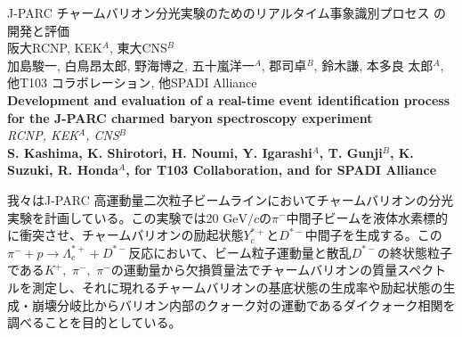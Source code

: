 \documentclass[12pt,a4paper,upLaTeX]{jsarticle}
\begin{document}
\vspace{-5pt}
\begin{center}
{\gt \Large J-PARC チャームバリオン分光実験のためのリアルタイム事象識別プロセス の開発と評価 }\\[14pt]

{\gt \large 阪大RCNP, KEK$^A$, 東大CNS$^B$ \\ 加島駿一, 白鳥昂太郎, 野海博之, 五十嵐洋一$^A$, 郡司卓$^B$, 鈴木謙, 本多良
太郎$^A$, 他T103 コラボレーション, 他SPADI Alliance}\\[5pt]


{\large \bf Development and evaluation of a real-time event identification
process for the J-PARC charmed baryon spectroscopy experiment}\\[5pt]

{\large \it RCNP, KEK$^A$, CNS$^B$}\\

{\large \bf S. Kashima, K. Shirotori, H. Noumi, Y. Igarashi$^A$, T. Gunji$^B$, K.
Suzuki, R. Honda$^A$, for T103 Collaboration, and for SPADI Alliance}\\

\end{center}

\vspace{10pt}



我々はJ-PARC 高運動量二次粒子ビームラインにおいてチャームバリオンの分光実験を計画している。この実験では20 $\mathrm{GeV}/c$の$\pi^-$中間子ビームを液体水素標的に衝突させ、チャームバリオンの励起状態$Y_c^{*+}$と$D^
{*-}$中間子を生成する。この$\pi^-+p\rightarrow\Lambda_c^{*+}+D^{*-}$反応において、ビーム粒子運動量と散乱$D^{*-}$の終状態粒子である$K^+,\,\,\pi^-,\,\,\pi^-$の運動量から欠損質量法でチャームバリオンの質量スペクトルを測定し、それに現れるチャームバリオンの基底状態の生成率や励起状態の生成・崩壊分岐比からバリオン内部のクォーク対の運動であるダイクォーク相関を調べることを目的としている。
\end{document}
